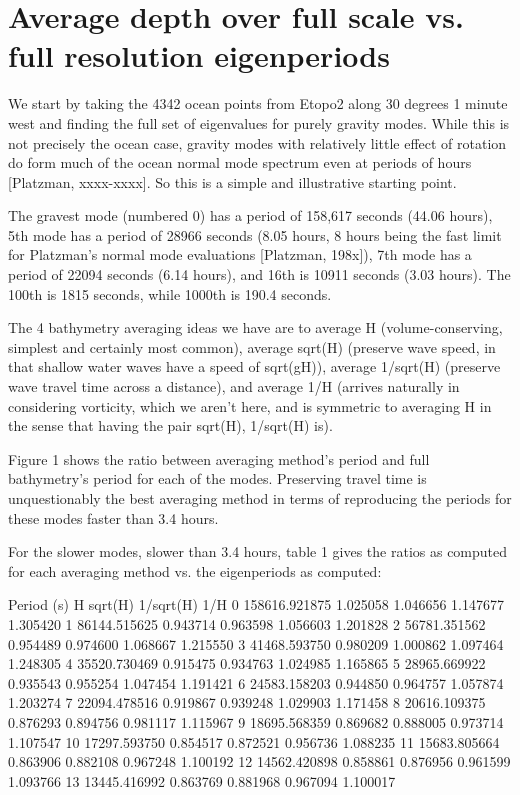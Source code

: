 \section{Average depth over full scale vs. full resolution eigenperiods}

  We start by taking the 4342 ocean points from Etopo2 along 
30 degrees 1 minute west and finding the full set of eigenvalues for 
purely gravity modes.  While this is not precisely the ocean case, 
gravity modes with relatively little effect of rotation do form much 
of the ocean normal mode spectrum even at periods of hours [Platzman, 
xxxx-xxxx].  So this is a simple and illustrative starting point.

  The gravest mode (numbered 0) has a period of 158,617 seconds (44.06 hours),
5th mode has a period of 28966 seconds (8.05 hours, 8 hours being the fast
limit for Platzman's normal mode evaluations [Platzman, 198x]), 7th mode has 
a period of 22094 seconds (6.14 hours), and 16th is 10911 seconds 
(3.03 hours).  The 100th is 1815 seconds, while 1000th is 190.4 seconds.

  The 4 bathymetry averaging ideas we have are to average H 
(volume-conserving, simplest and certainly most common), average 
sqrt(H) (preserve wave speed, in that shallow water waves have a 
speed of sqrt(gH)), average 1/sqrt(H) (preserve wave travel time 
across a distance), and average 1/H (arrives naturally in considering 
vorticity, which we aren't here, and is symmetric to averaging H in 
the sense that having the pair sqrt(H), 1/sqrt(H) is).

  Figure 1 shows the ratio between averaging method's period and 
full bathymetry's period for each of the modes.  Preserving travel
time is unquestionably the best averaging method in terms of reproducing 
the periods for these modes faster than 3.4 hours.  

  For the slower modes, slower than 3.4 hours, table 1 gives the 
ratios as computed for each averaging method vs. the eigenperiods
as computed:

   Period (s)       H       sqrt(H) 1/sqrt(H)  1/H 
 0 158616.921875  1.025058 1.046656 1.147677 1.305420
  1 86144.515625  0.943714 0.963598 1.056603 1.201828
  2 56781.351562  0.954489 0.974600 1.068667 1.215550
  3 41468.593750  0.980209 1.000862 1.097464 1.248305
  4 35520.730469  0.915475 0.934763 1.024985 1.165865
  5 28965.669922  0.935543 0.955254 1.047454 1.191421
  6 24583.158203  0.944850 0.964757 1.057874 1.203274
  7 22094.478516  0.919867 0.939248 1.029903 1.171458
  8 20616.109375  0.876293 0.894756 0.981117 1.115967
  9 18695.568359  0.869682 0.888005 0.973714 1.107547
 10 17297.593750  0.854517 0.872521 0.956736 1.088235
 11 15683.805664  0.863906 0.882108 0.967248 1.100192
 12 14562.420898  0.858861 0.876956 0.961599 1.093766
 13 13445.416992  0.863769 0.881968 0.967094 1.100017

